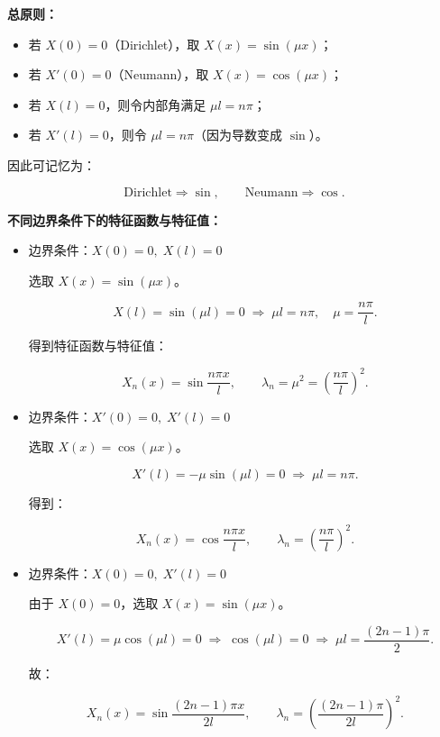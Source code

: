 \begin{lemma}

\noindent\textbf{总原则：}

\begin{itemize}
    \item 若 $X(0)=0$（Dirichlet），取 $X(x)=\sin(\mu x)$；
    \item 若 $X'(0)=0$（Neumann），取 $X(x)=\cos(\mu x)$；
    \item 若 $X(l)=0$，则令内部角满足 $\mu l = n\pi$；
    \item 若 $X'(l)=0$，则令 $\mu l = n\pi$（因为导数变成 $\sin$）。
\end{itemize}

因此可记忆为：

\[
\text{Dirichlet} \Rightarrow \sin,\qquad 
\text{Neumann} \Rightarrow \cos.
\]

\bigskip

\noindent\textbf{不同边界条件下的特征函数与特征值：}

\begin{itemize}

    \item[\textbf{(1)}] 
    边界条件：$X(0)=0,\;X(l)=0$

    选取 $X(x)=\sin(\mu x)$。

    \[
    X(l)=\sin(\mu l)=0 \;\Longrightarrow\; \mu l = n\pi,\quad \mu=\frac{n\pi}{l}.
    \]

    得到特征函数与特征值：

    \[
    X_n(x)=\sin\frac{n\pi x}{l},\qquad 
    \lambda_n=\mu^2=\left(\frac{n\pi}{l}\right)^2.
    \]

    \bigskip

    \item[\textbf{(2)}]
    边界条件：$X'(0)=0,\;X'(l)=0$

    选取 $X(x)=\cos(\mu x)$。

    \[
    X'(l)=-\mu\sin(\mu l)=0
    \;\Longrightarrow\;
    \mu l = n\pi.
    \]

    得到：

    \[
    X_n(x)=\cos\frac{n\pi x}{l},\qquad
    \lambda_n=\left(\frac{n\pi}{l}\right)^2.
    \]

    \bigskip

    \item[\textbf{(3)}]
    边界条件：$X(0)=0,\;X'(l)=0$

    由于 $X(0)=0$，选取 $X(x)=\sin(\mu x)$。

    \[
    X'(l)=\mu\cos(\mu l)=0
    \;\Longrightarrow\;
    \cos(\mu l)=0
    \;\Longrightarrow\;
    \mu l=\frac{(2n-1)\pi}{2}.
    \]

    故：

    \[
    X_n(x)=\sin\frac{(2n-1)\pi x}{2l},\qquad
    \lambda_n=\left(\frac{(2n-1)\pi}{2l}\right)^2.
    \]

\end{itemize}

\end{lemma}
